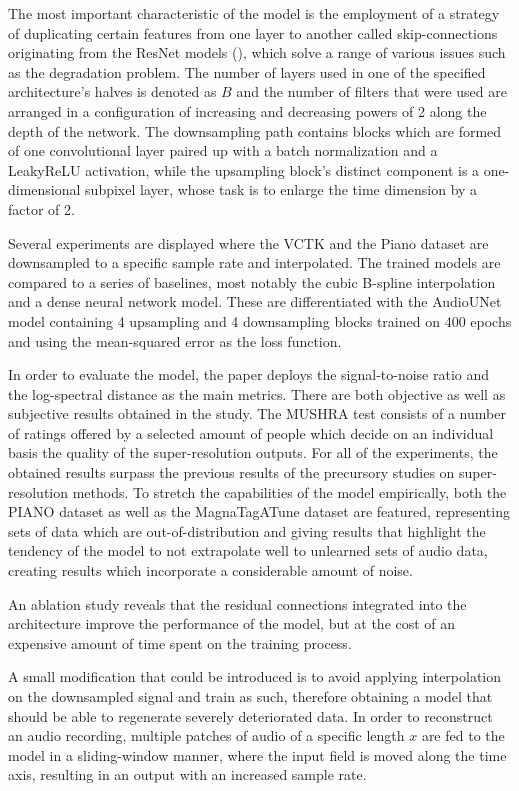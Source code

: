 \documentclass[conference]{IEEEtran}
\begin{document}
	The most important characteristic of the model is the employment of a strategy of duplicating certain features from one layer to another called skip-connections originating from the ResNet models (\textcite{resnet2015}), which solve a range of various issues such as the degradation problem. The number of layers used in one of the specified architecture's halves is denoted as \(B\) and the number of filters that were used are arranged in a configuration of increasing and decreasing powers of 2 along the depth of the network. The downsampling path contains blocks which are formed of one convolutional layer paired up with a batch normalization and a LeakyReLU activation, while the upsampling block's distinct component is a one-dimensional subpixel layer, whose task is to enlarge the time dimension by a factor of 2. 

	Several experiments are displayed where the VCTK and the Piano dataset are downsampled to a specific sample rate and interpolated. The trained models are compared to a series of baselines, most notably the cubic B-spline interpolation and a dense neural network model. These are differentiated with the AudioUNet model containing 4 upsampling and 4 downsampling blocks trained on 400 epochs and using the mean-squared error as the loss function.

	In order to evaluate the model, the paper deploys the signal-to-noise ratio and the log-spectral distance as the main metrics. There are both objective as well as subjective results obtained in the study. The MUSHRA test consists of a number of ratings offered by a selected amount of people which decide on an individual basis the quality of the super-resolution outputs. For all of the experiments, the obtained results surpass the previous results of the precursory studies on super-resolution methods. To stretch the capabilities of the model empirically, both the PIANO dataset as well as the MagnaTagATune dataset are featured, representing sets of data which are out-of-distribution and giving results that highlight the tendency of the model to not extrapolate well to unlearned sets of audio data, creating results which incorporate a considerable amount of noise. 

	An ablation study reveals that the residual connections integrated into the architecture improve the performance of the model, but at the cost of an expensive amount of time spent on the training process.

	A small modification that could be introduced is to avoid applying interpolation on the downsampled signal and train as such, therefore obtaining a model that should be able to regenerate severely deteriorated data. In order to reconstruct an audio recording, multiple patches of audio of a specific length \(x\) are fed to the model in a sliding-window manner, where the input field is moved along the time axis, resulting in an output with an increased sample rate.
\end{document}
